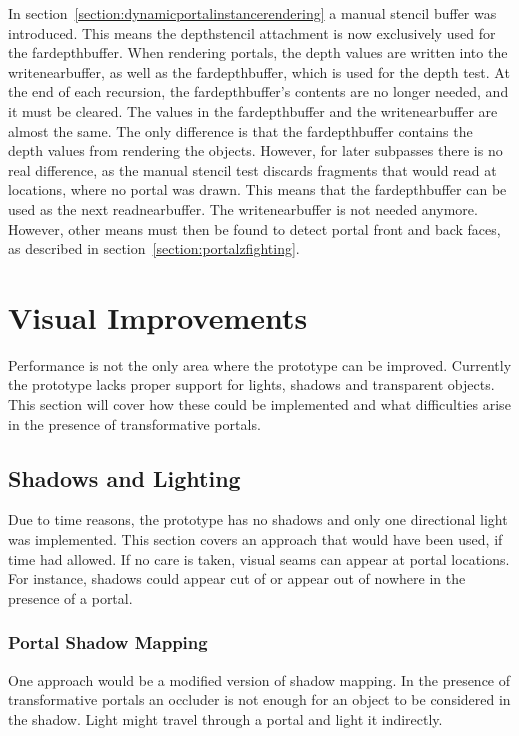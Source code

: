 In section~\ref{section:dynamicportalinstancerendering} a manual stencil buffer was introduced. This means the depthstencil attachment is now exclusively used for the \gls{fardepthbuffer}. When rendering portals, the depth values are written into the \gls{writenearbuffer}, as well as the \gls{fardepthbuffer}, which is used for the depth test. At the end of each recursion, the \gls{fardepthbuffer}'s contents are no longer needed, and it must be cleared. The values in the \gls{fardepthbuffer} and the  \gls{writenearbuffer} are almost the same. The only difference is that the \gls{fardepthbuffer} contains the depth values from rendering the objects. However, for later subpasses there is no real difference, as the manual stencil test discards fragments that would read at locations, where no portal was drawn. This means that the \gls{fardepthbuffer} can be used as the next \gls{readnearbuffer}. The \gls{writenearbuffer} is not needed anymore. However, other means must then be found to detect portal front and back faces, as described in section~\ref{section:portalzfighting}.

\chapter{Visual Improvements}
Performance is not the only area where the prototype can be improved. Currently the prototype lacks proper support for lights, shadows and transparent objects. This section will cover how these could be implemented and what difficulties arise in the presence of transformative portals.

\section{Shadows and Lighting}
Due to time reasons, the prototype has no shadows and only one directional light was implemented. This section covers an approach that would have been used, if time had allowed. If no care is taken, visual seams can appear at portal locations. For instance, shadows could appear cut of or appear out of nowhere in the presence of a portal.

\subsection{Portal Shadow Mapping}
One approach would be a modified version of shadow mapping. In the presence of transformative portals an occluder is not enough for an object to be considered in the shadow. Light might travel through a portal and light it indirectly.

